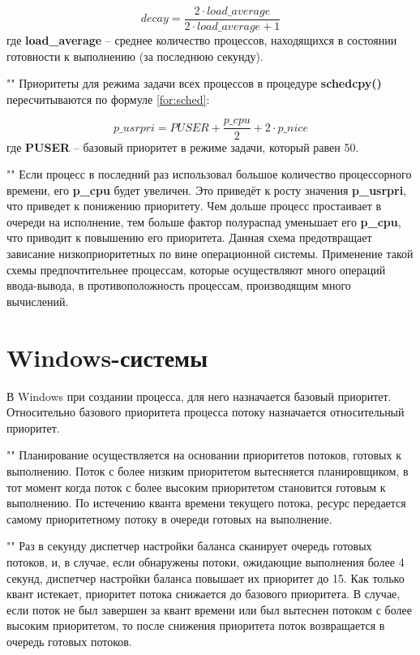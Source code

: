 \begin{equation}
    \label{for:bsd}
    decay = \frac{2 \cdot load\_average}{2 \cdot load\_average + 1}
\end{equation}
где \textbf{load\_average} -- среднее количество процессов, находящихся в состоянии готовности к выполнению (за последнюю секунду).

""\newline
\noindent Приоритеты для режима задачи всех процессов в процедуре \textbf{schedcpy()} пересчитываются по формуле \eqref{for:sched}:

\begin{equation}
    \label{for:sched}
    p\_usrpri = PUSER + \frac{p\_cpu}{2} + 2 \cdot p\_nice
\end{equation}
где \textbf{PUSER} -- базовый приоритет в режиме задачи, который равен 50.

""\newline 
\noindent Если процесс в последний раз использовал большое количество процессорного времени, его \textbf{p\_cpu} будет увеличен. Это приведёт к росту значения \textbf{p\_usrpri}, что приведет к понижению приоритету. Чем дольше процесс простаивает в очереди на исполнение, тем больше фактор полураспад уменьшает его \textbf{p\_cpu}, что приводит к повышению его приоритета. Данная схема предотвращает зависание низкоприоритетных по вине операционной системы. Применение такой схемы предпочтительнее процессам, которые осуществляют много операций ввода-вывода, в противоположность процессам, производящим много вычислений.

\section{Windows-системы}

\noindent В Windows при создании процесса, для него назначается базовый приоритет. Относительно базового приоритета процесса потоку назначается относительный приоритет.

""\newline 
\noindent Планирование осуществляется на основании приоритетов потоков, готовых к выполнению. Поток с более низким приоритетом вытесняется планировщиком, в тот момент когда поток с более высоким приоритетом становится готовым к выполнению. По истечению кванта времени текущего потока, ресурс передается самому приоритетному потоку в очереди готовых на выполнение.

""\newline
\noindent Раз в секунду диспетчер настройки баланса сканирует очередь готовых потоков, и, в случае, если обнаружены потоки, ожидающие выполнения более 4 секунд, диспетчер настройки баланса повышает их приоритет до 15. Как только квант истекает, приоритет потока снижается до базового приоритета. В случае, если поток не был завершен за квант времени или был вытеснен потоком с более высоким приоритетом, то после снижения приоритета поток возвращается в очередь готовых потоков.

